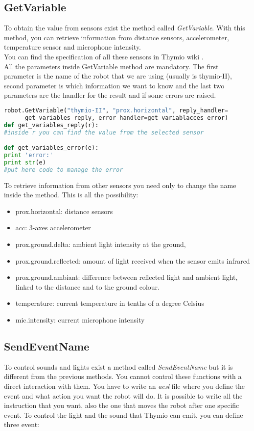 \documentclass[12pt]{article}%
\begin{document}
	\subsection{GetVariable}
		To obtain the value from sensors exist the method called \textit{GetVariable}.
		With this method, you can retrieve information from distance sensors, accelerometer, temperature sensor and microphone intensity.\\
		You can find the specification of all these sensors in Thymio wiki \cite{thymiowiki}.\\
		All the parameters inside GetVariable method are mandatory. The first parameter is the name of the robot that we are using (usually is thymio-II), second parameter is which information we want to know and the last two parameters are the handler for the result and if some errors are raised. 
		
		\begin{lstlisting}[language=Python]
robot.GetVariable("thymio-II", "prox.horizontal", reply_handler=
      get_variables_reply, error_handler=get_variablacces_error)
def get_variables_reply(r):
#inside r you can find the value from the selected sensor

def get_variables_error(e):
print 'error:'
print str(e)
#put here code to manage the error
		\end{lstlisting}
		
		To retrieve information from other sensors you need only to change the name inside the method. 
		This is all the possibility:
		\begin{itemize}
			\item prox.horizontal: distance sensors
			\item acc: 3-axes accelerometer
			\item prox.ground.delta: ambient light intensity at the ground,
			\item prox.ground.reflected: amount of light received when the sensor emits infrared
			\item prox.ground.ambiant: difference between reflected light and ambient light, linked to the distance and to the ground colour.
			\item temperature: current temperature in tenths of a degree Celsius
			\item mic.intensity: current microphone intensity
		\end{itemize}

	\subsection{SendEventName}
		To control sounds and lights exist a method called \textit{SendEventName} but it is different from the previous methods. 
		You cannot control these functions with a direct interaction with them. 
		You have to write an \textit{aesl} file where you define the event and what action you want the robot will do. 
		It is possible to write all the instruction that you want, also the one that moves the robot after one specific event.
		To control the light and the sound that Thymio can emit, you can define three event:
		
\end{document}
